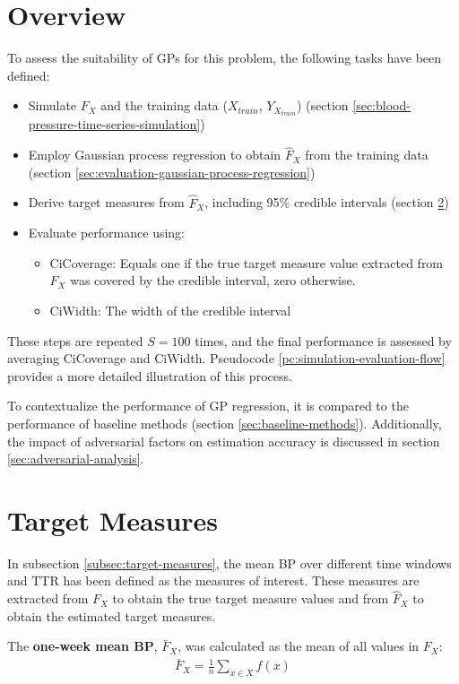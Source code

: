 \section{Overview}

To assess the suitability of GPs for this problem, the following tasks have been defined:
\begin{itemize}
    \item Simulate $F_X$ and the training data ($X_{train}$, $Y_{X_{train}}$)
    (section \ref{sec:blood-pressure-time-series-simulation})
    \item Employ Gaussian process regression to obtain $\hat{F}_X$ from the training data
     (section \ref{sec:evaluation-gaussian-process-regression})
    \item Derive target measures from $\hat{F}_X$, including 95\% credible intervals (section \ref{sec:target-measures})
    \item Evaluate performance using:
    \begin{itemize}
        \item CiCoverage: Equals one if the true target measure value extracted from $F_X$ was
        covered by the credible interval, zero otherwise.
        \item CiWidth: The width of the credible interval
    \end{itemize}
\end{itemize}
These steps are repeated $S=100$ times, and the final performance is assessed by averaging CiCoverage and CiWidth.
Pseudocode \ref{pc:simulation-evaluation-flow} provides a more detailed illustration of this process.

To contextualize the performance of GP regression, it is compared to the performance of
baseline methods (section \ref{sec:baseline-methods}).
Additionally, the impact of adversarial factors on estimation accuracy is discussed in section \ref{sec:adversarial-analysis}.

\section{Target Measures}\label{sec:target-measures}

In subsection \ref{subsec:target-measures}, the mean BP over different time
windows and TTR has been defined as the measures of interest. These measures
are extracted from $F_X$ to obtain the true target measure values and
from $\hat{F}_X$ to obtain the estimated target measures.

The \textbf{one-week mean BP}, $\bar{F}_X$, was calculated as the mean of all values in
$F_X$:
\begin{gather*}
    \bar{F}_{X} = \frac{1}{n} \sum_{x \in X} f(x)
\end{gather*}

